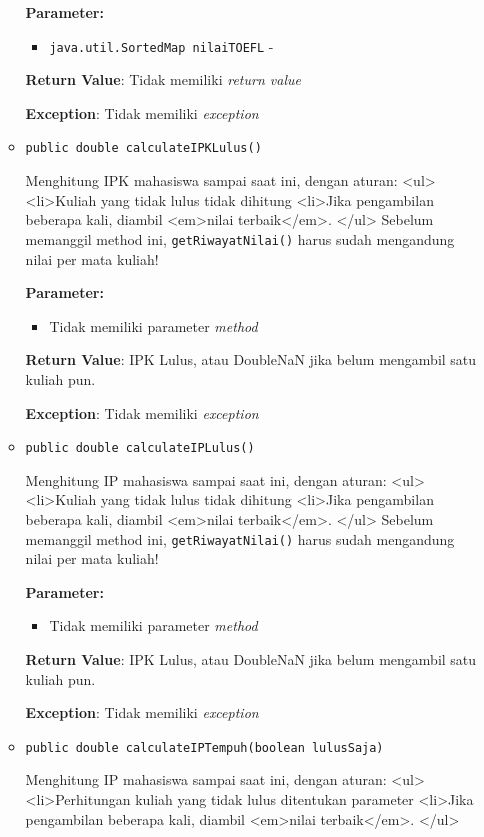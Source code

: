 \documentclass{article}
\begin{document}
\begin{enumerate}
\begin{itemize}
\textbf{Parameter:}
\begin{itemize}
\item \texttt{java.util.SortedMap nilaiTOEFL} - 
\end{itemize}
\textbf{Return Value}: Tidak memiliki \textit{return value}

\textbf{Exception}: Tidak memiliki \textit{exception}

\item \texttt{public double calculateIPKLulus()}

Menghitung IPK mahasiswa sampai saat ini, dengan aturan:
 <ul>
   <li>Kuliah yang tidak lulus tidak dihitung
   <li>Jika pengambilan beberapa kali, diambil <em>nilai terbaik</em>.
 </ul>
 Sebelum memanggil method ini, \texttt{getRiwayatNilai()} harus sudah mengandung nilai per mata kuliah!

\textbf{Parameter:}
\begin{itemize}
\item Tidak memiliki parameter \textit{method}
\end{itemize}
\textbf{Return Value}: IPK Lulus, atau  DoubleNaN jika belum mengambil satu kuliah pun.

\textbf{Exception}: Tidak memiliki \textit{exception}

\item \texttt{public double calculateIPLulus()}

Menghitung IP mahasiswa sampai saat ini, dengan aturan:
 <ul>
   <li>Kuliah yang tidak lulus tidak dihitung
   <li>Jika pengambilan beberapa kali, diambil <em>nilai terbaik</em>.
 </ul>
 Sebelum memanggil method ini, \texttt{getRiwayatNilai()} harus sudah mengandung nilai per mata kuliah!

\textbf{Parameter:}
\begin{itemize}
\item Tidak memiliki parameter \textit{method}
\end{itemize}
\textbf{Return Value}: IPK Lulus, atau  DoubleNaN jika belum mengambil satu kuliah pun.

\textbf{Exception}: Tidak memiliki \textit{exception}

\item \texttt{public double calculateIPTempuh(boolean lulusSaja)}

Menghitung IP mahasiswa sampai saat ini, dengan aturan:
 <ul>
   <li>Perhitungan kuliah yang tidak lulus ditentukan parameter
   <li>Jika pengambilan beberapa kali, diambil <em>nilai terbaik</em>.
 </ul>


\end{itemize}
\end{enumerate}
\end{document}
